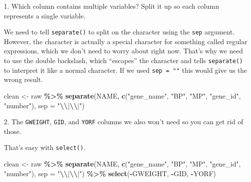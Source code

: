 \documentclass[
]{book}
\newenvironment{Shaded}{\begin{snugshade}}{\end{snugshade}}
\newcommand{\AttributeTok}[1]{\textcolor[rgb]{0.13,0.29,0.53}{#1}}
\newcommand{\FunctionTok}[1]{\textcolor[rgb]{0.13,0.29,0.53}{\textbf{#1}}}
\newcommand{\NormalTok}[1]{#1}
\newcommand{\OtherTok}[1]{\textcolor[rgb]{0.56,0.35,0.01}{#1}}
\newcommand{\SpecialCharTok}[1]{\textcolor[rgb]{0.81,0.36,0.00}{\textbf{#1}}}
\newcommand{\StringTok}[1]{\textcolor[rgb]{0.31,0.60,0.02}{#1}}
\begin{document}
1. Which column contains multiple variables? Split it up so each column represents a single variable.

We need to tell \texttt{separate()} to split on the \texttt{\textbar{}\textbar{}} character using the \texttt{sep} argument. However, the \texttt{\textbar{}} character is actually a special character for something called regular expressions, which we don't need to worry about right now. That's why we need to use the double backslash, which ``escapes'' the \texttt{\textbar{}} character and tells \texttt{separate()} to interpret it like a normal character. If we used \texttt{sep\ =\ "\textbar{}\textbar{}"} this would give us the wrong result.

\begin{Shaded}
\begin{Highlighting}[]
\NormalTok{clean }\OtherTok{\textless{}{-}}\NormalTok{ raw }\SpecialCharTok{\%\textgreater{}\%}
  \FunctionTok{separate}\NormalTok{(NAME, }\FunctionTok{c}\NormalTok{(}\StringTok{"gene\_name"}\NormalTok{, }\StringTok{"BP"}\NormalTok{, }\StringTok{"MP"}\NormalTok{, }\StringTok{"gene\_id"}\NormalTok{, }\StringTok{"number"}\NormalTok{), }\AttributeTok{sep =} \StringTok{"}\SpecialCharTok{\textbackslash{}\textbackslash{}}\StringTok{|}\SpecialCharTok{\textbackslash{}\textbackslash{}}\StringTok{|"}\NormalTok{)}
\end{Highlighting}
\end{Shaded}

2. The \texttt{GWEIGHT}, \texttt{GID}, and \texttt{YORF} columns we also won't need so you can get rid of those.

That's easy with \texttt{select()}.

\begin{Shaded}
\begin{Highlighting}[]
\NormalTok{clean }\OtherTok{\textless{}{-}}\NormalTok{ raw }\SpecialCharTok{\%\textgreater{}\%}
  \FunctionTok{separate}\NormalTok{(NAME, }\FunctionTok{c}\NormalTok{(}\StringTok{"gene\_name"}\NormalTok{, }\StringTok{"BP"}\NormalTok{, }\StringTok{"MP"}\NormalTok{, }\StringTok{"gene\_id"}\NormalTok{, }\StringTok{"number"}\NormalTok{), }\AttributeTok{sep =} \StringTok{"}\SpecialCharTok{\textbackslash{}\textbackslash{}}\StringTok{|}\SpecialCharTok{\textbackslash{}\textbackslash{}}\StringTok{|"}\NormalTok{) }\SpecialCharTok{\%\textgreater{}\%}
  \FunctionTok{select}\NormalTok{(}\SpecialCharTok{{-}}\NormalTok{GWEIGHT, }\SpecialCharTok{{-}}\NormalTok{GID, }\SpecialCharTok{{-}}\NormalTok{YORF)}
\end{Highlighting}
\end{Shaded}
\end{document}
